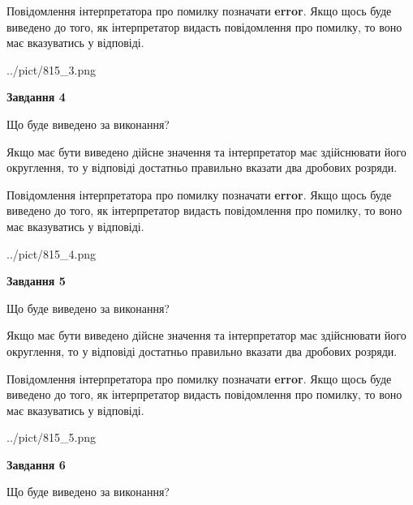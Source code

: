 \documentclass[12pt, ukrainian]{article}
\begin{document}
{\begin {Large}
Повідомлення інтерпретатора про помилку позначати \textbf{error}.
Якщо щось буде виведено до того, як інтерпретатор видасть повідомлення про помилку, 
то воно має вказуватись у відповіді. \par

\begin{center}
	{../pict/815_3.png}
\end{center}
\newpage

{\begin {center}\textbf{Завдання 4}\end {center}}\par
Що буде виведено за виконання? \par

Якщо має бути виведено дійсне значення та інтерпретатор має здійснювати його округлення, 
то у відповіді достатньо правильно вказати два дробових розряди.

Повідомлення інтерпретатора про помилку позначати \textbf{error}.
Якщо щось буде виведено до того, як інтерпретатор видасть повідомлення про помилку, 
то воно має вказуватись у відповіді. \par

\begin{center}
	{../pict/815_4.png}
\end{center}
\newpage

{\begin {center}\textbf{Завдання 5}\end {center}}\par
Що буде виведено за виконання? \par

Якщо має бути виведено дійсне значення та інтерпретатор має здійснювати його округлення, 
то у відповіді достатньо правильно вказати два дробових розряди.

Повідомлення інтерпретатора про помилку позначати \textbf{error}.
Якщо щось буде виведено до того, як інтерпретатор видасть повідомлення про помилку, 
то воно має вказуватись у відповіді. \par

\begin{center}
	{../pict/815_5.png}
\end{center}
\newpage

{\begin {center}\textbf{Завдання 6}\end {center}}\par
Що буде виведено за виконання? \par


\end{Large}}
\end{document}
